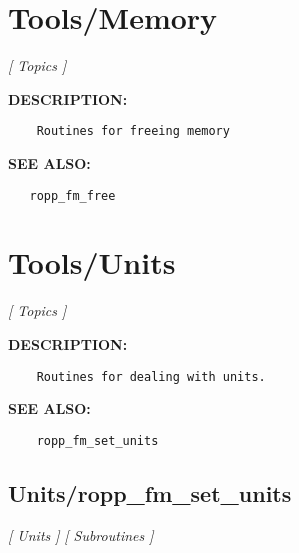 \section{Tools/Memory}
\textsl{[ Topics ]}

\label{ch:robo89}
\label{ch:Tools_Memory}
\textbf{DESCRIPTION:}\hspace{0.08in}\begin{Verbatim}
    Routines for freeing memory
\end{Verbatim}
\textbf{SEE ALSO:}\hspace{0.08in}\begin{Verbatim}
   ropp_fm_free
\end{Verbatim}
\section{Tools/Units}
\textsl{[ Topics ]}

\label{ch:robo90}
\label{ch:Tools_Units}
\textbf{DESCRIPTION:}\hspace{0.08in}\begin{Verbatim}
    Routines for dealing with units.
\end{Verbatim}
\textbf{SEE ALSO:}\hspace{0.08in}\begin{Verbatim}
    ropp_fm_set_units
\end{Verbatim}
\subsection{Units/ropp\_fm\_set\_units}
\textsl{[ Units ]}
\textsl{[ Subroutines ]}

